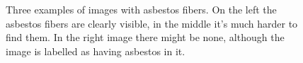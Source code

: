 \begin{figure}[h]
\centering
{}

\caption{Three examples of images with asbestos fibers. On the left the asbestos fibers are clearly visible, in the middle it's much harder to find them. In the right image there might be none, although the image is labelled as having asbestos in it.}
\label{fig:asbestos_examples}
\end{figure}

